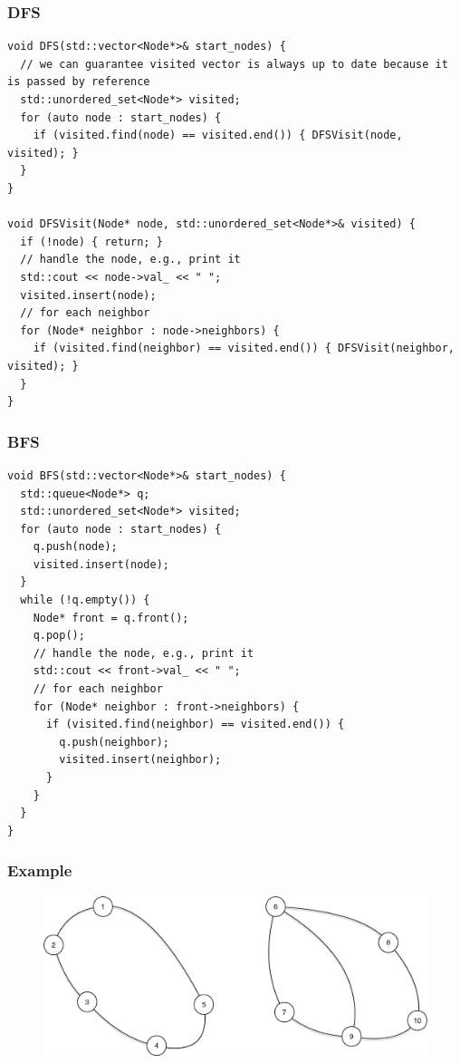 \subsubsection{DFS}
\begin{lstlisting}
void DFS(std::vector<Node*>& start_nodes) {
  // we can guarantee visited vector is always up to date because it is passed by reference
  std::unordered_set<Node*> visited;
  for (auto node : start_nodes) {
    if (visited.find(node) == visited.end()) { DFSVisit(node, visited); }
  }
}

void DFSVisit(Node* node, std::unordered_set<Node*>& visited) {
  if (!node) { return; }
  // handle the node, e.g., print it
  std::cout << node->val_ << " ";
  visited.insert(node);
  // for each neighbor
  for (Node* neighbor : node->neighbors) {
    if (visited.find(neighbor) == visited.end()) { DFSVisit(neighbor, visited); }
  }
}
\end{lstlisting}
\subsubsection{BFS}
\begin{lstlisting}
void BFS(std::vector<Node*>& start_nodes) {
  std::queue<Node*> q;
  std::unordered_set<Node*> visited;
  for (auto node : start_nodes) {
    q.push(node);
    visited.insert(node);
  }
  while (!q.empty()) {
    Node* front = q.front();
    q.pop();
    // handle the node, e.g., print it
    std::cout << front->val_ << " ";
    // for each neighbor
    for (Node* neighbor : front->neighbors) {
      if (visited.find(neighbor) == visited.end()) {
        q.push(neighbor);
        visited.insert(neighbor);
      }
    }
  }
}
\end{lstlisting}

\subsubsection{Example}
\begin{figure}[H]
\centering
\includegraphics[width=0.7\linewidth]{images/undirected_graph_eg}
\end{figure}

